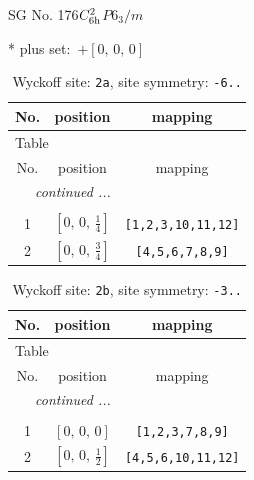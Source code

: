 \documentclass[fleqn,8pt]{jsarticle}
\begin{document}
\setcounter{MaxMatrixCols}{32}

\renewcommand{\tablename}{Table~}
\renewcommand{\figurename}{Figure~}
\begin{center}
\LARGE
SG No. 176\quad$C_{\rm 6h}^{2}$\quad$P6_3/m$\quad[ hexagonal ]
\end{center}
* plus set:\,\,\,$+\left[ 0,\, 0,\, 0 \right]$
\renewcommand{\arraystretch}{1.2}
\begin{longtable}{ccc}
\caption{Wyckoff site: {\tt 2a}, site symmetry: {\tt -6..}}
 \\
 \hline \hline
No. & position & mapping \\ \hline \endfirsthead

\multicolumn{2}{l}{\tablename\ \thetable{}} \\
 \hline \hline
No. & position & mapping \\ \hline \endhead

 \hline \hline
\multicolumn{2}{r}{\footnotesize\it continued ...} \\ \endfoot

 \hline \hline
\multicolumn{2}{r}{} \\ \endlastfoot

1 & $\left[ 0,\, 0,\, \frac{1}{4} \right]$ & {\tt [1,2,3,10,11,12]} \\ \hline
2 & $\left[ 0,\, 0,\, \frac{3}{4} \right]$ & {\tt [4,5,6,7,8,9]} \\
\end{longtable}
\renewcommand{\arraystretch}{1.2}
\begin{longtable}{ccc}
\caption{Wyckoff site: {\tt 2b}, site symmetry: {\tt -3..}}
 \\
 \hline \hline
No. & position & mapping \\ \hline \endfirsthead

\multicolumn{2}{l}{\tablename\ \thetable{}} \\
 \hline \hline
No. & position & mapping \\ \hline \endhead

 \hline \hline
\multicolumn{2}{r}{\footnotesize\it continued ...} \\ \endfoot

 \hline \hline
\multicolumn{2}{r}{} \\ \endlastfoot

1 & $\left[ 0,\, 0,\, 0 \right]$ & {\tt [1,2,3,7,8,9]} \\ \hline
2 & $\left[ 0,\, 0,\, \frac{1}{2} \right]$ & {\tt [4,5,6,10,11,12]} \\
\end{longtable}
\end{document}
